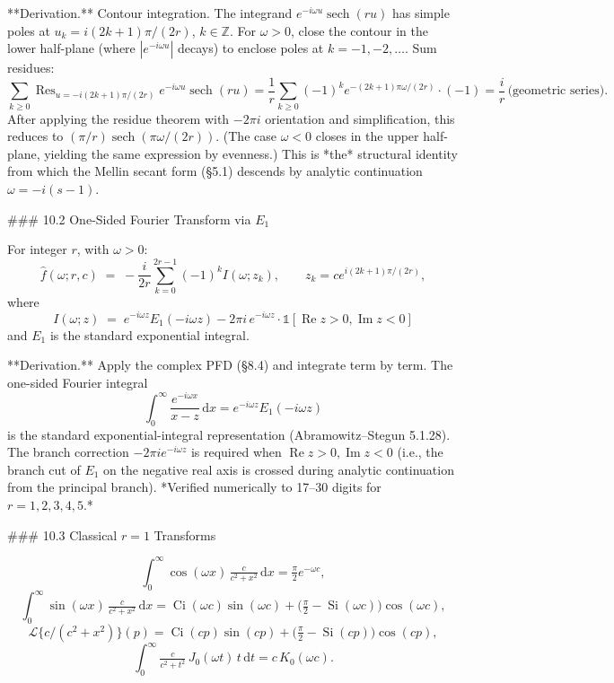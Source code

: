 **Derivation.** Contour integration. The integrand $e^{-i\omega u}\operatorname{sech}(ru)$ has simple poles at $u_{k} = i(2k+1)\pi/(2r)$, $k\in\mathbb Z$. For $\omega>0$, close the contour in the lower half-plane (where $|e^{-i\omega u}|$ decays) to enclose poles at $k=-1,-2,\ldots$. Sum residues:
$$
\sum_{k\ge 0}\operatorname{Res}_{u=-i(2k+1)\pi/(2r)} e^{-i\omega u}\operatorname{sech}(ru) = \frac{1}{r}\sum_{k\ge 0}(-1)^{k}e^{-(2k+1)\pi\omega/(2r)}\cdot(-1) = \frac{i}{r}\,\text{(geometric series)}.
$$
After applying the residue theorem with $-2\pi i$ orientation and simplification, this reduces to $(\pi/r)\operatorname{sech}(\pi\omega/(2r))$. (The case $\omega<0$ closes in the upper half-plane, yielding the same expression by evenness.) This is *the* structural identity from which the Mellin secant form (§5.1) descends by analytic continuation $\omega = -i(s-1)$.

### 10.2 One‑Sided Fourier Transform via $E_{1}$

For integer $r$, with $\omega>0$:
$$
\widehat f(\omega;r,c) \;=\; -\frac{i}{2r}\sum_{k=0}^{2r-1}(-1)^{k}I(\omega;z_{k}),\qquad z_{k} = ce^{i(2k+1)\pi/(2r)},
$$
where
$$
I(\omega;z) \;=\; e^{-i\omega z}E_{1}(-i\omega z) - 2\pi i\,e^{-i\omega z}\cdot\mathbb 1[\operatorname{Re} z>0,\operatorname{Im} z<0]
$$
and $E_{1}$ is the standard exponential integral.

**Derivation.** Apply the complex PFD (§8.4) and integrate term by term. The one-sided Fourier integral
$$
\int_{0}^{\infty}\frac{e^{-i\omega x}}{x-z}\,\mathrm dx = e^{-i\omega z}E_{1}(-i\omega z)
$$
is the standard exponential-integral representation (Abramowitz–Stegun 5.1.28). The branch correction $-2\pi i e^{-i\omega z}$ is required when $\operatorname{Re} z>0,\operatorname{Im} z<0$ (i.e., the branch cut of $E_{1}$ on the negative real axis is crossed during analytic continuation from the principal branch). *Verified numerically to 17–30 digits for $r=1,2,3,4,5$.*

### 10.3 Classical $r=1$ Transforms

$$
\int_{0}^{\infty}\cos(\omega x)\,\tfrac{c}{c^{2}+x^{2}}\,\mathrm dx = \tfrac{\pi}{2}e^{-\omega c},
$$
$$
\int_{0}^{\infty}\sin(\omega x)\,\tfrac{c}{c^{2}+x^{2}}\,\mathrm dx = \operatorname{Ci}(\omega c)\sin(\omega c) + \bigl(\tfrac{\pi}{2}-\operatorname{Si}(\omega c)\bigr)\cos(\omega c),
$$
$$
\mathcal L\bigl\{c/(c^{2}+x^{2})\bigr\}(p) = \operatorname{Ci}(cp)\sin(cp) + \bigl(\tfrac{\pi}{2}-\operatorname{Si}(cp)\bigr)\cos(cp),
$$
$$
\int_{0}^{\infty}\tfrac{c}{c^{2}+t^{2}}\,J_{0}(\omega t)\,t\,\mathrm dt = c\,K_{0}(\omega c).
$$


